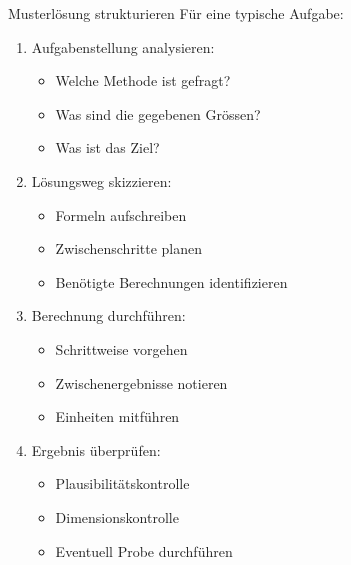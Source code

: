 \begin{example2}{Musterlösung strukturieren}
Für eine typische Aufgabe:
\begin{enumerate}
    \item Aufgabenstellung analysieren:
    \begin{itemize}
        \item Welche Methode ist gefragt?
        \item Was sind die gegebenen Grössen?
        \item Was ist das Ziel?
    \end{itemize}
    
    \item Lösungsweg skizzieren:
    \begin{itemize}
        \item Formeln aufschreiben
        \item Zwischenschritte planen
        \item Benötigte Berechnungen identifizieren
    \end{itemize}
    
    \item Berechnung durchführen:
    \begin{itemize}
        \item Schrittweise vorgehen
        \item Zwischenergebnisse notieren
        \item Einheiten mitführen
    \end{itemize}
    
    \item Ergebnis überprüfen:
    \begin{itemize}
        \item Plausibilitätskontrolle
        \item Dimensionskontrolle
        \item Eventuell Probe durchführen
    \end{itemize}
\end{enumerate}
\end{example2}

